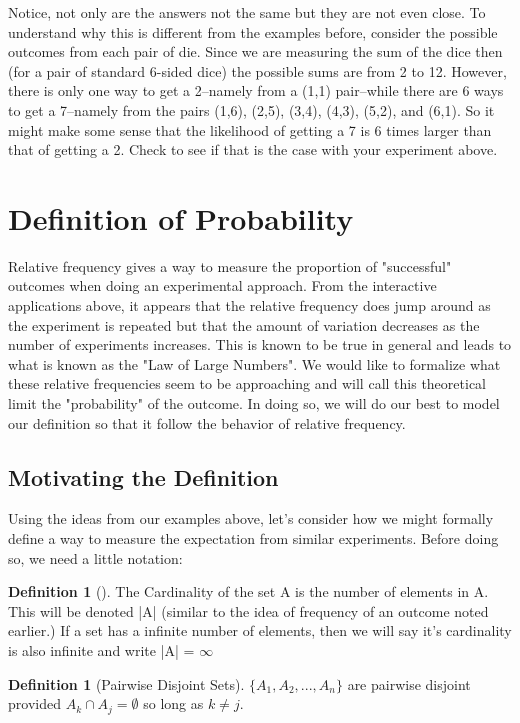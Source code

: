 \documentclass[10pt,]{book}
\theoremstyle{plain}
\theoremstyle{definition}
\newtheorem{definition}[theorem]{Definition}
\theoremstyle{definition}
\theoremstyle{definition}
\numberwithin{equation}{section}
\begin{document}
\par
Notice, not only are the answers not the same but they are not even close. To understand why this 
	is different from the examples before, consider the possible outcomes from each pair of die. Since we
	are measuring the sum of the dice then (for a pair of standard 6-sided dice) the possible sums are from 
	2 to 12. However, there is only one way to get a 2--namely from a (1,1) pair--while there are 6 ways to get
	a 7--namely from the pairs (1,6), (2,5), (3,4), (4,3), (5,2), and (6,1). So it might make some sense
	that the likelihood of getting a 7 is 6 times larger than that of getting a 2. Check to see if that
	is the case with your experiment above.%
\typeout{************************************************}
\typeout{************************************************}
\section[{Definition of Probability}]{Definition of Probability}\label{section-18}
\typeout{************************************************}
\typeout{************************************************}

		Relative frequency gives a way to measure the proportion of "successful" outcomes when doing an experimental approach. From the interactive applications above, it appears that the relative frequency does jump around as the experiment is repeated but that the amount of variation decreases as the number of experiments increases. This is known to be true in general and leads to what is known as the "Law of Large Numbers". We would like to formalize what these relative frequencies seem to be approaching and will call this theoretical limit the "probability" of the outcome. In doing so, we will do our best to model our definition so that it follow the behavior of relative frequency.
\typeout{************************************************}
\typeout{************************************************}
\subsection[{Motivating the Definition}]{Motivating the Definition}\label{ProbabilityDefns}
Using the ideas from our examples above, let's consider how we might formally define a way
		to measure the expectation from similar experiments.  Before doing so, we need a little notation:%
\begin{definition}[{}]\label{definition-20}
The Cardinality of the set A is the number of elements in A. This will be denoted |A| (similar
			to the idea of frequency of an outcome noted earlier.) If a set has
			a infinite number of elements, then we will say it's cardinality is also infinite and 
			write |A| = \(\infty\)\end{definition}
\begin{definition}[{Pairwise Disjoint Sets}]\label{definition-21}
\( \{ A_1, A_2, ... , A_n \}\) are pairwise disjoint provided \(A_k \cap A_j = \emptyset\) so long as \(k \ne j\).
			\end{definition}
\par
\end{document}
